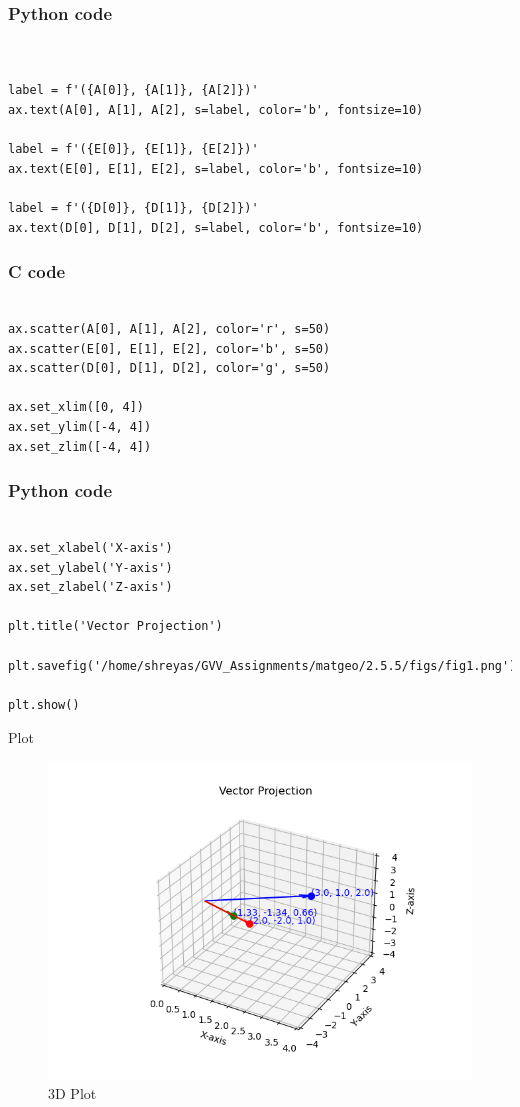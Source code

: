 \documentclass{beamer}
\begin{document}
\begin{frame}[fragile]
\frametitle{Python code}
\begin{lstlisting}


label = f'({A[0]}, {A[1]}, {A[2]})'
ax.text(A[0], A[1], A[2], s=label, color='b', fontsize=10)

label = f'({E[0]}, {E[1]}, {E[2]})'
ax.text(E[0], E[1], E[2], s=label, color='b', fontsize=10)

label = f'({D[0]}, {D[1]}, {D[2]})'
ax.text(D[0], D[1], D[2], s=label, color='b', fontsize=10)

\end{lstlisting}
\end{frame}
\begin{frame}[fragile]
\frametitle{C code}
\begin{lstlisting}

ax.scatter(A[0], A[1], A[2], color='r', s=50)
ax.scatter(E[0], E[1], E[2], color='b', s=50)
ax.scatter(D[0], D[1], D[2], color='g', s=50)

ax.set_xlim([0, 4])
ax.set_ylim([-4, 4])
ax.set_zlim([-4, 4])

\end{lstlisting}
\end{frame}

\begin{frame}[fragile]
\frametitle{Python code}
\begin{lstlisting}

ax.set_xlabel('X-axis')
ax.set_ylabel('Y-axis')
ax.set_zlabel('Z-axis')

plt.title('Vector Projection')

plt.savefig('/home/shreyas/GVV_Assignments/matgeo/2.5.5/figs/fig1.png')

plt.show()
\end{lstlisting}
\end{frame}

\begin{frame}{Plot}
    \begin{figure}[H]
    \centering
    \includegraphics[width=0.8\columnwidth]{figs/fig1.png}
    \caption{3D Plot}
    \label{3D Plot}
\end{figure}
\end{frame}
\end{document}
